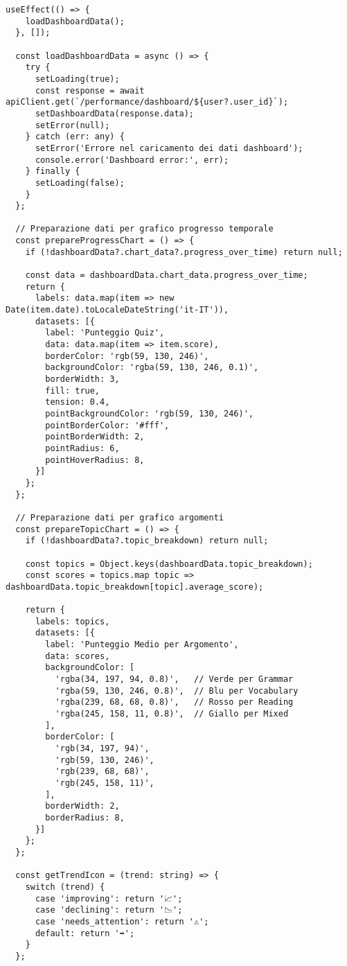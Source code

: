 \documentclass[a4paper, 14pt, oneside]{extbook}
\begin{document}
\begin{lstlisting}[style=javascriptstyle, caption=Dashboard Intelligente con Analytics Avanzate, label=lst:dashboard-component]
  useEffect(() => {
    loadDashboardData();
  }, []);

  const loadDashboardData = async () => {
    try {
      setLoading(true);
      const response = await apiClient.get(`/performance/dashboard/${user?.user_id}`);
      setDashboardData(response.data);
      setError(null);
    } catch (err: any) {
      setError('Errore nel caricamento dei dati dashboard');
      console.error('Dashboard error:', err);
    } finally {
      setLoading(false);
    }
  };

  // Preparazione dati per grafico progresso temporale
  const prepareProgressChart = () => {
    if (!dashboardData?.chart_data?.progress_over_time) return null;

    const data = dashboardData.chart_data.progress_over_time;
    return {
      labels: data.map(item => new Date(item.date).toLocaleDateString('it-IT')),
      datasets: [{
        label: 'Punteggio Quiz',
        data: data.map(item => item.score),
        borderColor: 'rgb(59, 130, 246)',
        backgroundColor: 'rgba(59, 130, 246, 0.1)',
        borderWidth: 3,
        fill: true,
        tension: 0.4,
        pointBackgroundColor: 'rgb(59, 130, 246)',
        pointBorderColor: '#fff',
        pointBorderWidth: 2,
        pointRadius: 6,
        pointHoverRadius: 8,
      }]
    };
  };

  // Preparazione dati per grafico argomenti
  const prepareTopicChart = () => {
    if (!dashboardData?.topic_breakdown) return null;

    const topics = Object.keys(dashboardData.topic_breakdown);
    const scores = topics.map topic => dashboardData.topic_breakdown[topic].average_score);
    
    return {
      labels: topics,
      datasets: [{
        label: 'Punteggio Medio per Argomento',
        data: scores,
        backgroundColor: [
          'rgba(34, 197, 94, 0.8)',   // Verde per Grammar
          'rgba(59, 130, 246, 0.8)',  // Blu per Vocabulary  
          'rgba(239, 68, 68, 0.8)',   // Rosso per Reading
          'rgba(245, 158, 11, 0.8)',  // Giallo per Mixed
        ],
        borderColor: [
          'rgb(34, 197, 94)',
          'rgb(59, 130, 246)', 
          'rgb(239, 68, 68)',
          'rgb(245, 158, 11)',
        ],
        borderWidth: 2,
        borderRadius: 8,
      }]
    };
  };

  const getTrendIcon = (trend: string) => {
    switch (trend) {
      case 'improving': return '📈';
      case 'declining': return '📉';
      case 'needs_attention': return '⚠️';
      default: return '➡️';
    }
  };


\end{lstlisting}
\end{document}
